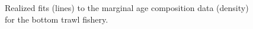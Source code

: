 \documentclass[
]{scrartcl}
\begin{document}
\begin{figure}[H]


\caption{\label{fig-marage_bt}Realized fits (lines) to the marginal age
composition data (density) for the bottom trawl fishery.}

\end{figure}%
\end{document}

